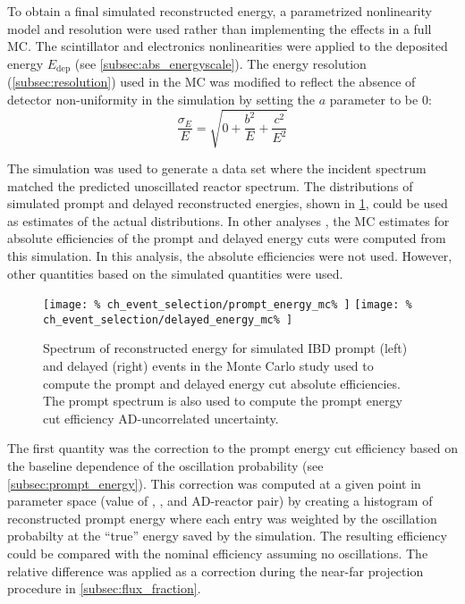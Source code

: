 To obtain a final simulated reconstructed energy,
a parametrized nonlinearity model and resolution were used
rather than implementing the effects in a full MC.
The scintillator and electronics nonlinearities were applied
to the deposited energy $E_{\text{dep}}$
(see \cref{subsec:abs_energyscale}).
The energy resolution (\cref{subsec:resolution}) used in the MC
was modified to reflect
the absence of detector non-uniformity in the simulation
by setting the $a$ parameter to be 0:
\begin{equation}
    \frac{\sigma_E}{E} = \sqrt{0 + \frac{b^2}{E} + \frac{c^2}{E^2}}
\end{equation}

The simulation was used to generate a data set
where the incident \nuebar{} spectrum
matched the predicted unoscillated reactor \nuebar{} spectrum.
The distributions of simulated prompt and delayed reconstructed energies,
shown in \cref{fig:prompt_eff_mc},
could be used as estimates of the actual distributions.
In other analyses \cite{nh2016}, the MC estimates
for absolute efficiencies of the prompt and delayed energy cuts
were computed from this simulation.
In this analysis, the absolute efficiencies were not used.
However, other quantities based on the simulated quantities
were used.

\begin{figure}
    \centering
    \texttt{[image: \%
        ch\_event\_selection/prompt\_energy\_mc\%
    ]}
    \texttt{[image: \%
        ch\_event\_selection/delayed\_energy\_mc\%
    ]}
    \caption{Spectrum of reconstructed energy for simulated IBD prompt (left)
        and delayed (right) events
        in the Monte Carlo study used to compute the prompt and delayed
        energy cut absolute efficiencies.
        The prompt spectrum is also used to compute the prompt energy cut
    efficiency AD-uncorrelated uncertainty.}
    \label{fig:prompt_eff_mc}
\end{figure}

The first quantity was the correction to the prompt energy cut efficiency
based on the baseline dependence of the oscillation probability
(see \cref{subsec:prompt_energy}).
This correction was computed at a given point in parameter space
(value of \thetaot{}, \dmee{}, and AD-reactor pair)
by creating a histogram of reconstructed prompt energy
where each entry was weighted by the oscillation probabilty
at the ``true'' \nuebar{} energy saved by the simulation.
The resulting efficiency could be compared
with the nominal efficiency assuming no oscillations.
The relative difference was applied as a correction
during the near-far projection procedure in \cref{subsec:flux_fraction}.

